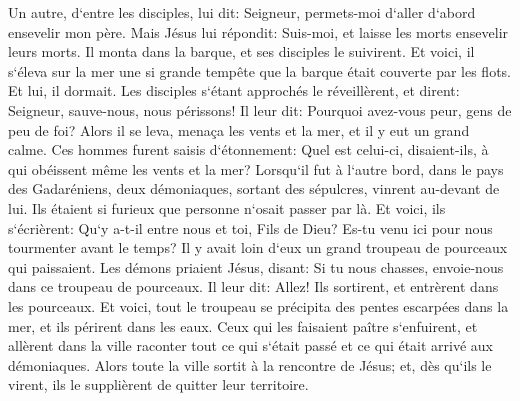 \verse Un autre, d`entre les disciples, lui dit: Seigneur, permets-moi d`aller d`abord ensevelir mon père. 
\verse Mais Jésus lui répondit: Suis-moi, et laisse les morts ensevelir leurs morts. 
\verse Il monta dans la barque, et ses disciples le suivirent. 
\verse Et voici, il s`éleva sur la mer une si grande tempête que la barque était couverte par les flots. Et lui, il dormait. 
\verse Les disciples s`étant approchés le réveillèrent, et dirent: Seigneur, sauve-nous, nous périssons! 
\verse Il leur dit: Pourquoi avez-vous peur, gens de peu de foi? Alors il se leva, menaça les vents et la mer, et il y eut un grand calme. 
\verse Ces hommes furent saisis d`étonnement: Quel est celui-ci, disaient-ils, à qui obéissent même les vents et la mer? 
\verse Lorsqu`il fut à l`autre bord, dans le pays des Gadaréniens, deux démoniaques, sortant des sépulcres, vinrent au-devant de lui. Ils étaient si furieux que personne n`osait passer par là. 
\verse Et voici, ils s`écrièrent: Qu`y a-t-il entre nous et toi, Fils de Dieu? Es-tu venu ici pour nous tourmenter avant le temps? 
\verse Il y avait loin d`eux un grand troupeau de pourceaux qui paissaient. 
\verse Les démons priaient Jésus, disant: Si tu nous chasses, envoie-nous dans ce troupeau de pourceaux. 
\verse Il leur dit: Allez! Ils sortirent, et entrèrent dans les pourceaux. Et voici, tout le troupeau se précipita des pentes escarpées dans la mer, et ils périrent dans les eaux. 
\verse Ceux qui les faisaient paître s`enfuirent, et allèrent dans la ville raconter tout ce qui s`était passé et ce qui était arrivé aux démoniaques. 
\verse Alors toute la ville sortit à la rencontre de Jésus; et, dès qu`ils le virent, ils le supplièrent de quitter leur territoire. 

